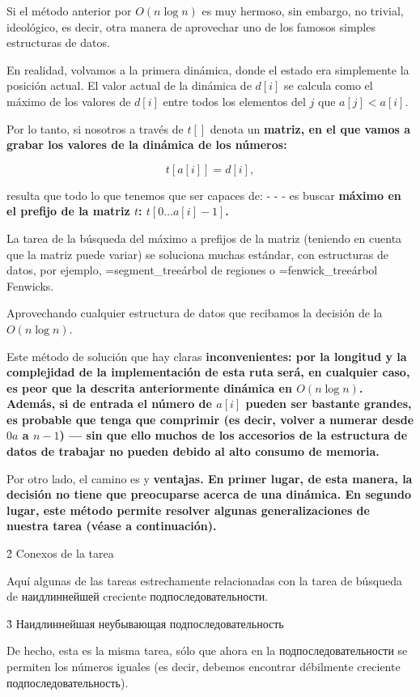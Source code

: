 Si el método anterior por $O (n \log n)$ es muy hermoso, sin embargo, no trivial, ideológico, es decir, otra manera de aprovechar uno de los famosos simples estructuras de datos.

En realidad, volvamos a la primera dinámica, donde el estado era simplemente la posición actual. El valor actual de la dinámica de $d[i]$ se calcula como el máximo de los valores de $d[i]$ entre todos los elementos del $j$ que $a[j] < a[i]$.

Por lo tanto, si nosotros a través de $t[]$ denota un \bf{matriz}, en el que vamos a grabar los valores de la dinámica de los números:

$$ t[a[i]] = d[i], $$

resulta que todo lo que tenemos que ser capaces de: - - - es buscar \bf{máximo en el prefijo} de la matriz $t$: $t[0 \ldots a[i]-1]$.

La tarea de la búsqueda del máximo a prefijos de la matriz (teniendo en cuenta que la matriz puede variar) se soluciona muchas estándar, con estructuras de datos, por ejemplo, \algohref=segment_tree{árbol de regiones} o \algohref=fenwick_tree{árbol Fenwicks}.

Aprovechando cualquier estructura de datos que recibamos la decisión de la $O (n \log n)$.

Este método de solución que hay claras \bf{inconvenientes}: por la longitud y la complejidad de la implementación de esta ruta será, en cualquier caso, es peor que la descrita anteriormente dinámica en $O (n \log n)$. Además, si de entrada el número de $a[i]$ pueden ser bastante grandes, es probable que tenga que comprimir (es decir, volver a numerar desde $0 a$ a $n-1$) --- sin que ello muchos de los accesorios de la estructura de datos de trabajar no pueden debido al alto consumo de memoria.

Por otro lado, el camino es y \bf{ventajas}. En primer lugar, de esta manera, la decisión no tiene que preocuparse acerca de una dinámica. En segundo lugar, este método permite resolver algunas generalizaciones de nuestra tarea (véase a continuación).



\h2{ Conexos de la tarea }

Aquí algunas de las tareas estrechamente relacionadas con la tarea de búsqueda de наидлиннейшей creciente подпоследовательности.


\h3{ Наидлиннейшая неубывающая подпоследовательность }

De hecho, esta es la misma tarea, sólo que ahora en la подпоследовательности se permiten los números iguales (es decir, debemos encontrar débilmente creciente подпоследовательность).

